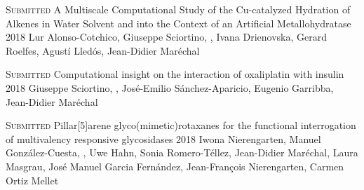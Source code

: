 

\hspace*{\fill}\bodyfontlight\footnotesize{}

\begin{cventries}

  \pubentry
    {\scshape{Submitted}} %
    {A Multiscale Computational Study of the Cu-catalyzed Hydration of Alkenes in Water Solvent and into the Context of an Artificial Metallohydratase} %
    {2018} %
    {} %
    {Lur Alonso-Cotchico, Giuseppe Sciortino, , Ivana Drienovska, Gerard Roelfes, Agustí Lledós, Jean-Didier Maréchal} %
    {} %
    {} %

  \pubentry
    {\scshape{Submitted}} %
    {Computational insight on the interaction of oxaliplatin with insulin} %
    {2018} %
    {} %
    {Giuseppe Sciortino, , José-Emilio Sánchez-Aparicio, Eugenio Garribba, Jean-Didier Maréchal} %
    {} %
    {} %


  \pubentry
    {\scshape{Submitted}} %
    {Pillar[5]arene glyco(mimetic)rotaxanes for the functional interrogation of multivalency responsive glycosidases} %
    {2018} %
    {} %
    {Iwona Nierengarten, Manuel González-Cuesta, , Uwe Hahn, Sonia Romero-Téllez, Jean-Didier Maréchal, Laura Masgrau, José Manuel Garcia Fernández, Jean-François Nierengarten, Carmen Ortiz Mellet} %
    {} %
    {} %

\end{cventries}

